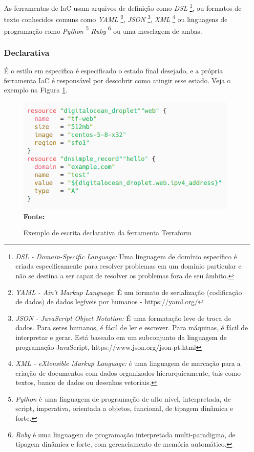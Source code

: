 As ferramentas de IaC usam arquivos de definição como \textit{DSL} \footnote{\textit{DSL - Domain-Specific Language:} Uma linguagem de domínio específico é criada especificamente para resolver problemas em um domínio particular e não se destina a ser capaz de resolver os problemas fora de seu âmbito. }, ou formatos de texto conhecidos comuns como \textit{ YAML} \footnote{\textit{YAML - Ain't  Markup Language}: É um formato de serialização (codificação de dados) de dados legíveis por humanos -  https://yaml.org/ }, \textit{JSON} \footnote{\textit{JSON - JavaScript Object Notation:} É uma formatação leve de troca de dados. Para seres humanos, é fácil de ler e escrever. Para máquinas, é fácil de interpretar e gerar. Está baseado em um subconjunto da linguagem de programação JavaScript, https://www.json.org/json-pt.html}, \textit{XML} \footnote{\textit{XML - eXtensible Markup Language:} é uma linguagem de marcação para a criação de documentos com dados organizados hierarquicamente, tais como textos, banco de dados ou desenhos vetoriais.}
  ou linguagens de programação como \textit{Python} \footnote{\textit{Python} é uma linguagem de programação de alto nível, interpretada, de script, imperativa, orientada a objetos, funcional, de tipagem dinâmica e forte.}  \textit{Ruby} \footnote{\textit{Ruby} é uma linguagem de programação interpretada multi-paradigma, de tipagem dinâmica e forte, com gerenciamento de memória automático.}  ou uma mesclagem de ambas.
  
  \subsubsection{Declarativa}
  É o estilo em  especifica é especificado o estado final desejado, e a própria ferramenta IaC é responsável por descobrir como atingir esse estado. Veja o exemplo na Figura \ref{fig:figura2}.
 
 \begin{figure}[ht]
	\centering	
	\caption[\hspace{0.1cm}Exemplo declarativo]{Exemplo de escrita declarativa da ferramenta Terraform}
	\vspace{-0.4cm}
	\includegraphics[width=0.98\textwidth]{artigo/figuras/terraform-declarative-exemple-01.png}
	 \vspace{-0.2cm}
	\\\textbf{\footnotesize Fonte: \cite{terraform01} }
	\label{fig:figura2}
\end{figure}
\vspace{-0.5cm}
 
